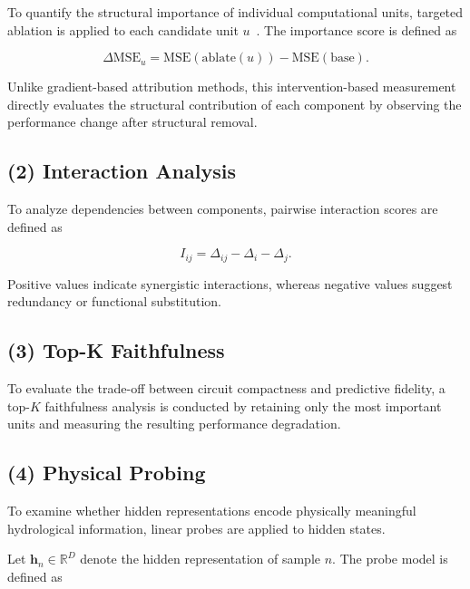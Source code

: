To quantify the structural importance of individual computational units, targeted ablation is applied to each candidate unit $u$~\cite{morcos2018importancesingledirectionsgeneralization}. The importance score is defined as

\begin{equation}
    \Delta \mathrm{MSE}_{u}=\mathrm{MSE}(\mathrm{ablate}(u))-\mathrm{MSE}(\mathrm{base}).
    \label{eq:Delta_MSE}
\end{equation}

Unlike gradient-based attribution methods, this intervention-based measurement directly evaluates the structural contribution of each component by observing the performance change after structural removal\cite{wang2022interpretabilitywildcircuitindirect}.

\subsection*{(2) Interaction Analysis}

To analyze dependencies between components, pairwise interaction scores are defined as

\begin{equation}
    I_{ij}=\Delta_{ij}-\Delta_i-\Delta_j.
    \label{eq:interaction}
\end{equation}

Positive values indicate synergistic interactions, whereas negative values suggest redundancy or functional substitution.

\subsection*{(3) Top-K Faithfulness}

To evaluate the trade-off between circuit compactness and predictive fidelity, a top-$K$ faithfulness analysis is conducted by retaining only the most important units and measuring the resulting performance degradation\cite{7552539}.

\subsection*{(4) Physical Probing}

To examine whether hidden representations encode physically meaningful hydrological information, linear probes are applied to hidden states\cite{pmlr-v97-verma19a}.

Let $\mathbf{h}_n\in\mathbb{R}^{D}$ denote the hidden representation of sample $n$. The probe model is defined as

